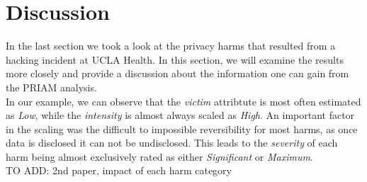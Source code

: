 \section{Discussion}
In the last section we took a look at the privacy harms that resulted from a hacking incident at UCLA Health. In this section, we will examine the results more closely and provide a discussion about the information one can gain from the PRIAM analysis.\\
In our example, we can observe that the \textit{victim} attribtute is most often estimated as \textit{Low}, while the \textit{intensity} is almost always scaled as \textit{High}. An important factor in the scaling was the difficult to impossible reversibility for most harms, as once data is disclosed it can not be undisclosed. This leads to the \textit{severity} of each harm being almost exclusively rated as either \textit{Significant} or \textit{Maximum}.\\
TO ADD: 2nd paper, impact of each harm category

